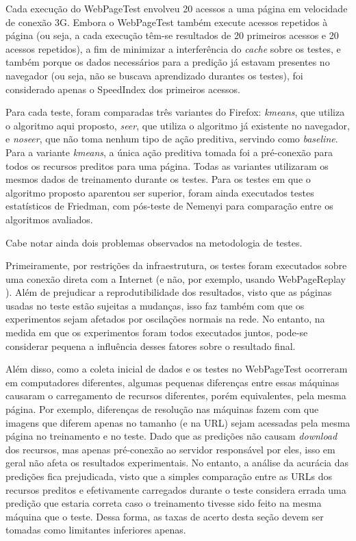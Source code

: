\documentclass[10pt,twocolumn,letterpaper]{article}
\begin{document}
Cada execução do WebPageTest envolveu 20 acessos a uma página em velocidade de conexão 3G.  Embora o WebPageTest também execute acessos repetidos à página (ou seja, a cada execução têm-se resultados de 20 primeiros acessos e 20 acessos repetidos), a fim de minimizar a interferência do \emph{cache} sobre os testes, e também porque os dados necessários para a predição já estavam presentes no navegador (ou seja, não se buscava aprendizado durantes os testes), foi considerado apenas o SpeedIndex dos primeiros acessos.

Para cada teste, foram comparadas três variantes do Firefox: \emph{kmeans}, que utiliza o algoritmo aqui proposto, \emph{seer}, que utiliza o algoritmo já existente no navegador, e \emph{noseer}, que não toma nenhum tipo de ação preditiva, servindo como \emph{baseline}. Para a variante \emph{kmeans}, a única ação preditiva tomada foi a pré-conexão para todos os recursos preditos para uma página. Todas as variantes utilizaram os mesmos dados de treinamento durante os testes. Para os testes em que o algoritmo proposto aparentou ser superior, foram ainda executados testes estatísticos de Friedman, com pós-teste de Nemenyi para comparação entre os algoritmos avaliados.

Cabe notar ainda dois problemas observados na metodologia de testes.

Primeiramente, por restrições da infraestrutura, os testes foram executados sobre uma conexão direta com a Internet (e não, por exemplo, usando WebPageReplay \cite{WebPageReplay:2013:Online}). Além de prejudicar a reprodutibilidade dos resultados, visto que as páginas usadas no teste estão sujeitas a mudanças, isso faz também com que os experimentos sejam afetados por oscilações normais na rede. No entanto, na medida em que os experimentos foram todos executados juntos, pode-se considerar pequena a influência desses fatores sobre o resultado final.

Além disso, como a coleta inicial de dados e os testes no WebPageTest ocorreram em computadores diferentes, algumas pequenas diferenças entre essas máquinas causaram o carregamento de recursos diferentes, porém equivalentes, pela mesma página. Por exemplo, diferenças de resolução nas máquinas fazem com que imagens que diferem apenas no tamanho (e na URL) sejam acessadas pela mesma página no treinamento e no teste. Dado que as predições não causam \emph{download} dos recursos, mas apenas pré-conexão ao servidor responsável por eles, isso em geral não afeta os resultados experimentais. No entanto, a análise da acurácia das predições fica prejudicada, visto que a simples comparação entre as URLs dos recursos preditos e efetivamente carregados durante o teste considera errada uma predição que estaria correta caso o treinamento tivesse sido feito na mesma máquina que o teste. Dessa forma, as taxas de acerto desta seção devem ser tomadas como limitantes inferiores apenas.
\end{document}
